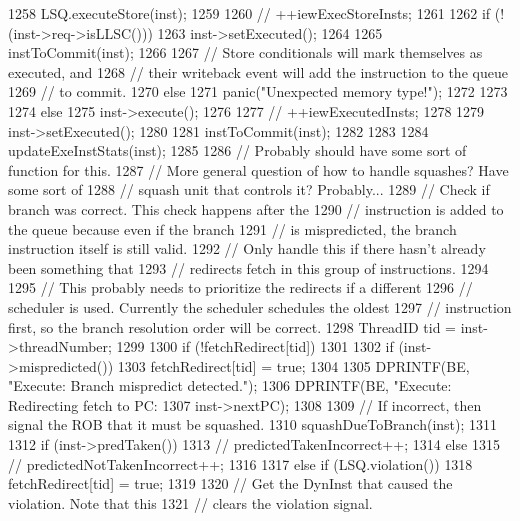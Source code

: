 \begin{DoxyCode}
{{{{1258                 LSQ.executeStore(inst);
1259 
1260 //                ++iewExecStoreInsts;
1261 
1262                 if (!(inst->req->isLLSC())) {
1263                     inst->setExecuted();
1264 
1265                     instToCommit(inst);
1266                 }
1267                 // Store conditionals will mark themselves as executed, and
1268                 // their writeback event will add the instruction to the queue
1269                 // to commit.
1270             } else {
1271                 panic("Unexpected memory type!\n");
1272             }
1273 
1274         } else {
1275             inst->execute();
1276 
1277 //            ++iewExecutedInsts;
1278 
1279             inst->setExecuted();
1280 
1281             instToCommit(inst);
1282         }
1283 
1284         updateExeInstStats(inst);
1285 
1286         // Probably should have some sort of function for this.
1287         // More general question of how to handle squashes?  Have some sort of
1288         // squash unit that controls it?  Probably...
1289         // Check if branch was correct.  This check happens after the
1290         // instruction is added to the queue because even if the branch
1291         // is mispredicted, the branch instruction itself is still valid.
1292         // Only handle this if there hasn't already been something that
1293         // redirects fetch in this group of instructions.
1294 
1295         // This probably needs to prioritize the redirects if a different
1296         // scheduler is used.  Currently the scheduler schedules the oldest
1297         // instruction first, so the branch resolution order will be correct.
1298         ThreadID tid = inst->threadNumber;
1299 
1300         if (!fetchRedirect[tid]) {
1301 
1302             if (inst->mispredicted()) {
1303                 fetchRedirect[tid] = true;
1304 
1305                 DPRINTF(BE, "Execute: Branch mispredict detected.\n");
1306                 DPRINTF(BE, "Execute: Redirecting fetch to PC: %
1307                         inst->nextPC);
1308 
1309                 // If incorrect, then signal the ROB that it must be squashed.
1310                 squashDueToBranch(inst);
1311 
1312                 if (inst->predTaken()) {
1313 //                    predictedTakenIncorrect++;
1314                 } else {
1315 //                    predictedNotTakenIncorrect++;
1316                 }
1317             } else if (LSQ.violation()) {
1318                 fetchRedirect[tid] = true;
1319 
1320                 // Get the DynInst that caused the violation.  Note that this
1321                 // clears the violation signal.
}}}}
\end{DoxyCode}
